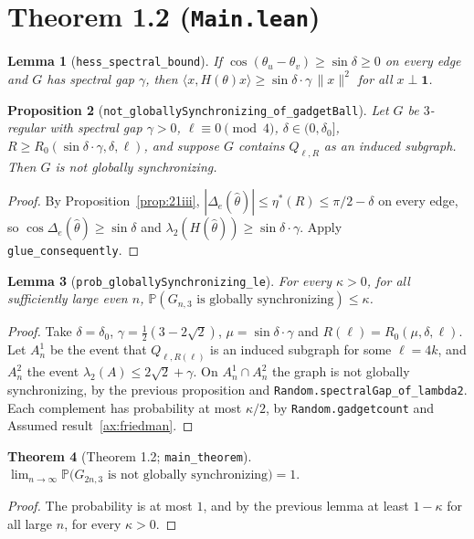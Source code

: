 \documentclass[11pt]{amsart}
\newcommand{\leanname}[1]{\texttt{\textcolor{black!75}{#1}}}
\newcommand{\lfile}[1]{\texttt{#1}}
\newcommand{\PP}{\mathbb{P}}
\newcommand{\one}{\mathbf{1}}
\newcommand{\Q}{Q_{\ell,R}}
\newcommand{\Gnt}{G_{n,3}}
\theoremstyle{plain}
\newtheorem{theorem}{Theorem}[section]
\newtheorem{lemma}[theorem]{Lemma}
\newtheorem{proposition}[theorem]{Proposition}
\theoremstyle{definition}
\theoremstyle{remark}
\begin{document}
\section{Theorem 1.2 (\lfile{Main.lean})}

\begin{lemma}[\leanname{hess\_spectral\_bound}]
If $\cos(\theta_u-\theta_v)\ge\sin\delta\ge0$ on every edge and $G$ has spectral gap $\gamma$, then
$\langle x,H(\theta)x\rangle\ge\sin\delta\cdot\gamma\,\|x\|^2$ for all $x\perp\one$.
\end{lemma}

\begin{proposition}[\leanname{not\_globallySynchronizing\_of\_gadgetBall}]
Let $G$ be $3$-regular with spectral gap $\gamma>0$, $\ell\equiv0\pmod4$, $\delta\in(0,\delta_0]$,
$R\ge R_0(\sin\delta\cdot\gamma,\delta,\ell)$, and suppose $G$ contains $\Q$ as an induced subgraph.
Then $G$ is not globally synchronizing.
\end{proposition}
\begin{proof}
By Proposition~\ref{prop:21iii}, $|\Delta_e(\hat\theta)|\le\eta^*(R)\le\pi/2-\delta$ on every edge,
so $\cos\Delta_e(\hat\theta)\ge\sin\delta$ and $\lambda_2(H(\hat\theta))\ge\sin\delta\cdot\gamma$.
Apply \leanname{glue\_consequently}.
\end{proof}

\begin{lemma}[\leanname{prob\_globallySynchronizing\_le}]
For every $\kappa>0$, for all sufficiently large even $n$,
$\PP(\Gnt\text{ is globally synchronizing})\le\kappa$.
\end{lemma}
\begin{proof}
Take $\delta=\delta_0$, $\gamma=\frac12(3-2\sqrt2)$, $\mu=\sin\delta\cdot\gamma$ and
$R(\ell)=R_0(\mu,\delta,\ell)$. Let $A^1_n$ be the event that $Q_{\ell,R(\ell)}$ is an induced
subgraph for some $\ell=4k$, and $A^2_n$ the event $\lambda_2(A)\le2\sqrt2+\gamma$. On
$A^1_n\cap A^2_n$ the graph is not globally synchronizing, by the previous proposition and
\leanname{Random.spectralGap\_of\_lambda2}. Each complement has probability at most $\kappa/2$, by
\leanname{Random.gadgetcount} and Assumed result~\ref{ax:friedman}.
\end{proof}

\begin{theorem}[Theorem 1.2; \leanname{main\_theorem}]\label{thm:main}
$\displaystyle\lim_{n\to\infty}\PP\bigl(G_{2n,3}\text{ is not globally synchronizing}\bigr)=1.$
\end{theorem}
\begin{proof}
The probability is at most $1$, and by the previous lemma at least $1-\kappa$ for all large $n$,
for every $\kappa>0$.
\end{proof}
\end{document}
